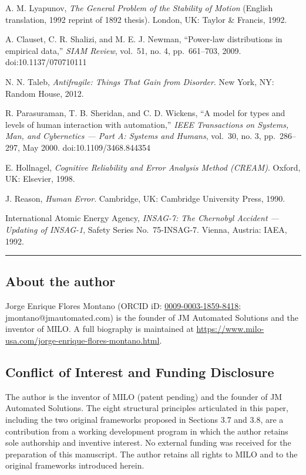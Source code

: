 \cite{ref8} A. M. Lyapunov, \emph{The General Problem of the Stability of
Motion} (English translation, 1992 reprint of 1892 thesis). London, UK:
Taylor \& Francis, 1992.

\cite{ref9} A. Clauset, C. R. Shalizi, and M. E. J. Newman, ``Power-law
distributions in empirical data,'' \emph{SIAM Review}, vol.~51, no. 4,
pp.~661--703, 2009. doi:10.1137/070710111

\cite{ref10} N. N. Taleb, \emph{Antifragile: Things That Gain from
Disorder}. New York, NY: Random House, 2012.

\cite{ref11} R. Parasuraman, T. B. Sheridan, and C. D. Wickens, ``A model
for types and levels of human interaction with automation,'' \emph{IEEE
Transactions on Systems, Man, and Cybernetics --- Part A: Systems and
Humans}, vol.~30, no. 3, pp.~286--297, May 2000. doi:10.1109/3468.844354

\cite{ref12} E. Hollnagel, \emph{Cognitive Reliability and Error Analysis
Method (CREAM)}. Oxford, UK: Elsevier, 1998.

\cite{ref13} J. Reason, \emph{Human Error}. Cambridge, UK: Cambridge
University Press, 1990.

\cite{ref14} International Atomic Energy Agency, \emph{INSAG-7: The
Chernobyl Accident --- Updating of INSAG-1}, Safety Series
No.~75-INSAG-7. Vienna, Austria: IAEA, 1992.

\begin{center}\rule{0.5\linewidth}{0.5pt}\end{center}

\subsection{About the author}\label{about-the-author}

Jorge Enrique Flores Montano (ORCID iD:
\href{https://orcid.org/0009-0003-1859-8418}{0009-0003-1859-8418};
jmontano@jmautomated.com) is the founder of JM Automated Solutions and
the inventor of MILO. A full biography is maintained at
\url{https://www.milo-usa.com/jorge-enrique-flores-montano.html}.

\subsection{Conflict of Interest and Funding
Disclosure}\label{conflict-of-interest-and-funding-disclosure}

The author is the inventor of MILO (patent pending) and the founder of
JM Automated Solutions. The eight structural principles articulated in
this paper, including the two original frameworks proposed in Sections
3.7 and 3.8, are a contribution from a working development program in
which the author retains sole authorship and inventive interest. No
external funding was received for the preparation of this manuscript.
The author retains all rights to MILO and to the original frameworks
introduced herein.

